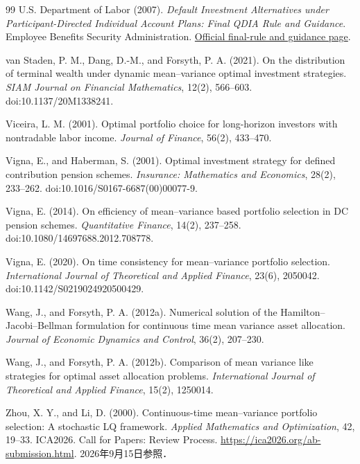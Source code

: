 \documentclass[10pt,a4paper]{article}
\theoremstyle{plain}
\theoremstyle{definition}
\begin{document}
\begin{thebibliography}{99}
U.S. Department of Labor (2007).
\emph{Default Investment Alternatives under Participant-Directed Individual Account Plans: Final QDIA Rule and Guidance}.
Employee Benefits Security Administration.
\href{https://www.dol.gov/agencies/ebsa/laws-and-regulations/laws/pension-protection-act}{Official final-rule and guidance page}.

van Staden, P. M., Dang, D.-M., and Forsyth, P. A. (2021).
On the distribution of terminal wealth under dynamic mean--variance optimal investment strategies.
\emph{SIAM Journal on Financial Mathematics}, 12(2), 566--603.
doi:10.1137/20M1338241.

Viceira, L. M. (2001).
Optimal portfolio choice for long-horizon investors with nontradable labor income.
\emph{Journal of Finance}, 56(2), 433--470.

Vigna, E., and Haberman, S. (2001).
Optimal investment strategy for defined contribution pension schemes.
\emph{Insurance: Mathematics and Economics}, 28(2), 233--262.
doi:10.1016/S0167-6687(00)00077-9.

Vigna, E. (2014).
On efficiency of mean--variance based portfolio selection in DC pension schemes.
\emph{Quantitative Finance}, 14(2), 237--258.
doi:10.1080/14697688.2012.708778.

Vigna, E. (2020).
On time consistency for mean--variance portfolio selection.
\emph{International Journal of Theoretical and Applied Finance}, 23(6), 2050042.
doi:10.1142/S0219024920500429.

Wang, J., and Forsyth, P. A. (2012a).
Numerical solution of the Hamilton--Jacobi--Bellman formulation for continuous time mean variance asset allocation.
\emph{Journal of Economic Dynamics and Control}, 36(2), 207--230.

Wang, J., and Forsyth, P. A. (2012b).
Comparison of mean variance like strategies for optimal asset allocation problems.
\emph{International Journal of Theoretical and Applied Finance}, 15(2), 1250014.

Zhou, X. Y., and Li, D. (2000).
Continuous-time mean--variance portfolio selection: A stochastic LQ framework.
\emph{Applied Mathematics and Optimization}, 42, 19--33.
ICA2026. Call for Papers: Review Process. \url{https://ica2026.org/ab-submission.html}. 2026年9月15日参照．
\end{thebibliography}
\endgroup
\end{document}
